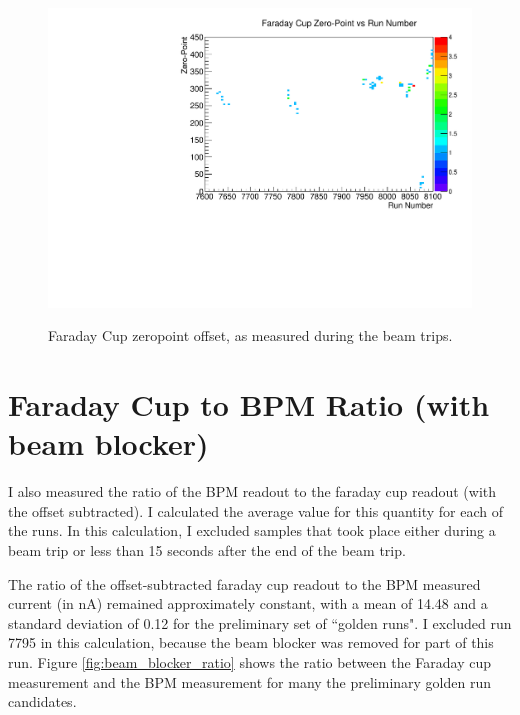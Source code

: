 \documentclass[11pt]{article}
\begin{document}
\begin{figure}[htbp] 
\begin{center}
\includegraphics[width =  .9\textwidth]{figures/zeropoint.pdf}
\label{fig:zero_point}
\caption{Faraday Cup zeropoint offset, as measured during the beam trips.} 

\end{center}
\end{figure}



\section{Faraday Cup to BPM Ratio (with beam blocker)}

I also measured the ratio of the BPM readout to the faraday cup readout (with the offset subtracted).  I calculated the average value for this quantity for each of the runs.  In this calculation, I excluded samples that took place either during a beam trip or less than 15 seconds after the end of the beam trip.  

The ratio of the offset-subtracted faraday cup readout to the BPM measured current (in nA) remained approximately constant, with a mean of 14.48 and a standard deviation of 0.12 for the preliminary set of ``golden runs".  I excluded run 7795 in this calculation, because the beam blocker was removed for part of this run.
Figure \ref{fig:beam_blocker_ratio} shows the ratio between the Faraday cup measurement and the BPM measurement for many the preliminary golden run candidates.
\end{document}
